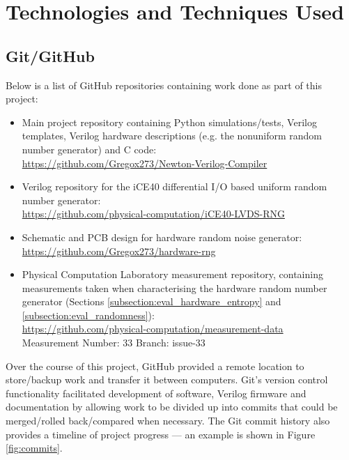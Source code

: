 \documentclass[12pt]{article}
\begin{document}
\newpage



%
%

\section{Technologies and Techniques Used} \label{section:tech}
  \subsection{Git/GitHub} \label{subsection:GitHub}
    Below is a list of GitHub repositories containing work done as part of this project:
    \begin{itemize}
        \item Main project repository containing Python simulations/tests, Verilog templates, Verilog hardware descriptions (e.g. the nonuniform random number generator) and C code:\\
        \url{https://github.com/Gregox273/Newton-Verilog-Compiler}
        \item Verilog repository for the iCE40 differential I/O based uniform random number generator:\\
        \url{https://github.com/physical-computation/iCE40-LVDS-RNG}
        \item Schematic and PCB design for hardware random noise generator:\\
        \url{https://github.com/Gregox273/hardware-rng}
        \item Physical Computation Laboratory measurement repository, containing measurements taken when characterising the hardware random number generator (Sections \ref{subsection:eval_hardware_entropy} and \ref{subsection:eval_randomness}):\\
        \url{https://github.com/physical-computation/measurement-data}\\
        Measurement Number: 33
        Branch: issue-33

    \end{itemize}

    Over the course of this project, GitHub provided a remote location to store/backup work and transfer it between computers. Git's version control functionality facilitated development of software, Verilog firmware and documentation by allowing work to be divided up into commits that could be merged/rolled back/compared when necessary. The Git commit history also provides a timeline of project progress --- an example is shown in Figure \ref{fig:commits}.
\end{document}
